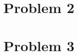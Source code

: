 \documentclass[12pt]{article}
\begin{document}
\section*{Problem 2}





\section*{Problem 3}

\begin{enumerate}[(a)]
	
\end{enumerate}
	
\end{document}
